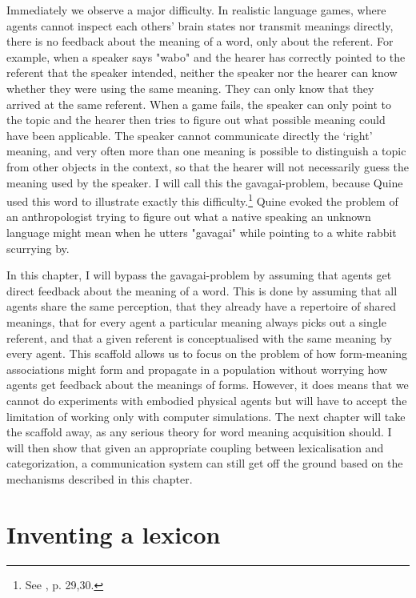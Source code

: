 Immediately we observe a major difficulty. In realistic
language games, where agents cannot inspect each others' 
brain states nor transmit meanings directly, 
there is no feedback about the 
meaning of a word, only about the referent. For example, 
when a speaker says "wabo" and the hearer has correctly pointed 
to the referent that the speaker intended, neither the 
speaker nor the hearer can know whether they were 
using the same meaning. They can only know that they 
arrived at the same referent. When a game fails, the speaker 
can only point to the topic and the hearer then 
tries to figure out what possible meaning 
could have been applicable. The speaker cannot
communicate directly the `right' meaning, and very often more 
than one meaning is possible to distinguish a topic from 
other objects in the context, so that the hearer will 
not necessarily guess the meaning used by the speaker. 
I will call this the gavagai-problem, because Quine 
used this word to illustrate exactly this difficulty.\footnote{See \cite{Quine:1960}, p. 29,30.}
Quine evoked the problem of an anthropologist
trying to figure out what a native speaking an unknown
language might mean when he utters "gavagai" while pointing
to a white rabbit scurrying by. 

In this chapter, I will bypass the gavagai-problem by assuming
that agents get direct feedback about the meaning of a word. 
This is done by assuming that all agents share the 
same perception, that they already have
a repertoire of shared meanings, that for every agent
a particular meaning always picks out a single referent, and 
that a given referent is conceptualised with the same meaning 
by every agent. This scaffold allows us to focus on the problem
of how form-meaning associations might form and propagate in
a population without worrying how agents get feedback about 
the meanings of forms. However, it does means that we cannot 
do experiments with embodied physical agents but will have
to accept the limitation of working only
with computer simulations. 
The next chapter will take the scaffold 
away, as any serious theory for word meaning 
acquisition should. I will then show that given an 
appropriate coupling between lexicalisation and categorization, 
a communication system can still get off the ground based on 
the mechanisms described in this chapter. 

\section{Inventing a lexicon}

